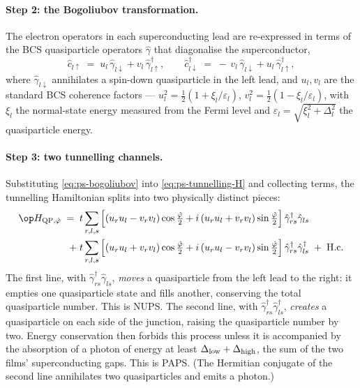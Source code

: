 \paragraph{Step 2: the Bogoliubov transformation.}
The electron operators in each superconducting lead are
re-expressed in terms of the BCS quasiparticle operators
$\hat\gamma$ that diagonalise the superconductor,
\begin{equation}
\label{eq:ps-bogoliubov}
\hat c_{l\uparrow} \;=\; u_l\,\hat\gamma_{l\downarrow}
+ v_l\,\hat\gamma_{l\uparrow}^\dagger,
\qquad
\hat c_{l\downarrow}^\dagger \;=\; -\,v_l\,\hat\gamma_{l\downarrow}
+ u_l\,\hat\gamma_{l\uparrow}^\dagger,
\end{equation}
where $\hat\gamma_{l\downarrow}$ annihilates a spin-down
quasiparticle in the left lead, and $u_l,v_l$ are the standard BCS
coherence factors --- $u_l^2=\tfrac12(1+\xi_l/\varepsilon_l)$,
$v_l^2=\tfrac12(1-\xi_l/\varepsilon_l)$, with $\xi_l$ the
normal-state energy measured from the Fermi level and
$\varepsilon_l=\sqrt{\xi_l^2+\Delta_l^2}$ the quasiparticle energy.

\paragraph{Step 3: two tunnelling channels.}
Substituting \cref{eq:ps-bogoliubov} into
\cref{eq:ps-tunnelling-H} and collecting terms, the tunnelling
Hamiltonian splits into two physically distinct pieces:
\begin{equation}
\label{eq:ps-two-channels}
\begin{aligned}
\op H_{{\rm QP},\hat\varphi} \;=\; t\sum_{r,l,s}
&\left[
(u_r u_l - v_r v_l)\cos\tfrac{\hat\varphi}{2}
+ i\,(u_r u_l + v_r v_l)\sin\tfrac{\hat\varphi}{2}
\right]\hat\gamma_{rs}^\dagger\hat\gamma_{ls}\\
+\; t\sum_{r,l,s}
&\left[
(u_r u_l + v_r v_l)\cos\tfrac{\hat\varphi}{2}
+ i\,(u_r u_l - v_r v_l)\sin\tfrac{\hat\varphi}{2}
\right]\hat\gamma_{rs}^\dagger\hat\gamma_{ls}^\dagger
\;+\; \text{H.c.}
\end{aligned}
\end{equation}
The first line, with $\hat\gamma_{rs}^\dagger\hat\gamma_{ls}$,
\emph{moves} a quasiparticle from the left lead to the right: it
empties one quasiparticle state and fills another, conserving the
total quasiparticle number. This is NUPS. The second line, with
$\hat\gamma_{rs}^\dagger\hat\gamma_{ls}^\dagger$, \emph{creates} a
quasiparticle on each side of the junction, raising the
quasiparticle number by two. Energy conservation then forbids this
process unless it is accompanied by the absorption of a photon of
energy at least $\Delta_{\rm low}+\Delta_{\rm high}$, the sum of the
two films' superconducting gaps. This is PAPS. (The Hermitian
conjugate of the second line annihilates two quasiparticles and
emits a photon.)

